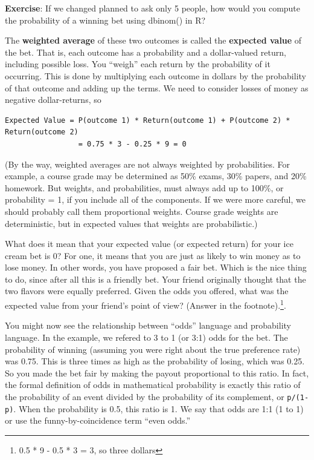 \documentclass[
  openany]{book}
\begin{document}
\textbf{Exercise}: If we changed planned to ask only 5 people, how would you compute the probability of a winning bet using dbinom() in R?

The \textbf{weighted average} of these two outcomes is called the \textbf{expected value} of the bet. That is, each outcome has a probability and a dollar-valued return, including possible loss. You ``weigh'' each return by the probability of it occurring. This is done by multiplying each outcome in dollars by the probability of that outcome and adding up the terms. We need to consider losses of money as negative dollar-returns, so

\begin{verbatim}
Expected Value = P(outcome 1) * Return(outcome 1) + P(outcome 2) * Return(outcome 2)
                 = 0.75 * 3 - 0.25 * 9 = 0
\end{verbatim}

(By the way, weighted averages are not always weighted by probabilities. For example, a course grade may be determined as 50\% exams, 30\% papers, and 20\% homework. But weights, and probabilities, must always add up to 100\%, or probability = 1, if you include all of the components. If we were more careful, we should probably call them proportional weights. Course grade weights are deterministic, but in expected values that weights are probabilistic.)

What does it mean that your expected value (or expected return) for your ice cream bet is 0? For one, it means that you are just as likely to win money as to lose money. In other words, you have proposed a fair bet. Which is the nice thing to do, since after all this is a friendly bet. Your friend originally thought that the two flavors were equally preferred. Given the odds you offered, what was the expected value from your friend's point of view? (Answer in the footnote).\footnote{0.5 * 9 - 0.5 * 3 = 3, so three dollars}.

You might now see the relationship between ``odds'' language and probability language. In the example, we refered to 3 to 1 (or 3:1) odds for the bet. The probability of winning (assuming you were right about the true preference rate) was 0.75. This is three times as high as the probability of losing, which was 0.25. So you made the bet fair by making the payout proportional to this ratio. In fact, the formal definition of odds in mathematical probability is exactly this ratio of the probability of an event divided by the probability of its complement, or \texttt{p/(1-p)}. When the probability is 0.5, this ratio is 1. We say that odds are 1:1 (1 to 1) or use the funny-by-coincidence term ``even odds.''
\end{document}
